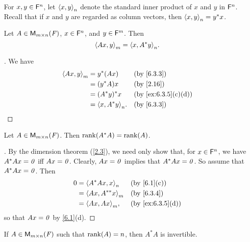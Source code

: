 \begin{defn}\label{6.3.3}
  For \(x, y \in \mathsf{F}^n\), let \(\left\langle x, y\right\rangle_n\) denote the standard inner product of \(x\) and \(y\) in \(\mathsf{F}^n\).
  Recall that if \(x\) and \(y\) are regarded as column vectors, then \(\left\langle x, y\right\rangle_n = y^* x\).
\end{defn}

\begin{lem}\label{6.3.4}
  Let \(A \in \mathsf{M}_{{m} \times n}({\mathit{F}})\), \(x \in \mathsf{F}^n\), and \(y \in \mathsf{F}^m\).
  Then
  \[
    \inn{Ax, y}_m = \inn{x, A^* y}_n.
  \]
\end{lem}

\begin{proof}[]
  We have
  \begin{align*}
    \inn{Ax, y}_m & = y^* (Ax)          &  & \text{(by \cref{6.3.3})}          \\
                  & = (y^* A) x         &  & \text{(by \cref{2.16})}           \\
                  & = (A^* y)^* x       &  & \text{(by \cref{ex:6.3.5}(c)(d))} \\
                  & = \inn{x, A^* y}_n. &  & \text{(by \cref{6.3.3})}
  \end{align*}
\end{proof}

\begin{lem}\label{6.3.5}
  Let \(A \in \mathsf{M}_{{m} \times n}({\mathit{F}})\).
  Then \(\rk{A^* A} = \rk{A}\).
\end{lem}

\begin{proof}[]
  By the dimension theorem (\cref{2.3}), we need only show that, for \(x \in \mathsf{F}^n\), we have \(A^* Ax = \mathit{0}\) iff \(Ax = \mathit{0}\).
  Clearly, \(Ax = \mathit{0}\) implies that \(A^* Ax = \mathit{0}\).
  So assume that \(A^* Ax = \mathit{0}\).
  Then
  \begin{align*}
    0 & = \inn{A^* Ax, x}_n    &  & \text{(by \cref{6.1}(c))}      \\
      & = \inn{Ax, A^{**} x}_m &  & \text{(by \cref{6.3.4})}       \\
      & = \inn{Ax, Ax}_m,      &  & \text{(by \cref{ex:6.3.5}(d))}
  \end{align*}
  so that \(Ax = \mathit{0}\) by \cref{6.1}(d).
\end{proof}

\begin{cor}\label{6.3.6}
  If \(A \in \mathsf{M}_{{m} \times n}({\mathit{F}})\) such that \(\rk{A} = n\), then \(A^* A\) is invertible.
\end{cor}

